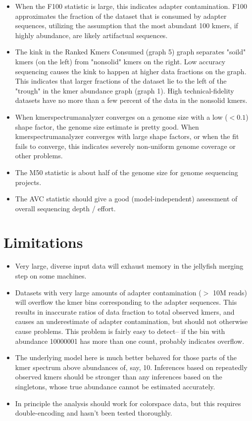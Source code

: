 \documentclass[11pt,fullpage]{article}
\begin{document}
\begin{itemize}
\item When the F100 statistic is large, this indicates adapter contamination.
F100 approximates the fraction of the dataset that is consumed by adapter sequences,
utilizing the assumption that the most abundant 100 kmers, if highly abundance,
are likely artifactual sequences.
\item The kink in the Ranked Kmers Consumed (graph 5) graph separates "soild" kmers
(on the left) from "nonsolid" kmers on the right.
Low accuracy sequencing causes the kink to happen at higher data fractions on the graph.
This indicates that larger fractions of the dataset lie to the left of the "trough" in
the kmer abundance graph (graph 1).
High technical-fidelity datasets have no more than a few percent of the data in the
nonsolid kmers.
\item When kmerspectrumanalyzer converges on a genome size with a low ($< 0.1$) shape
factor, the genome size estimate is pretty good.  When kmerspectrumanalyzer converges
with large shape factors, or when the fit fails to converge, this indicates severely
non-uniform genome coverage or other problems.
\item The M50 statistic is about half of the genome size for genome sequencing projects.
\item The AVC statistic should give a good (model-independent) assessment of overall sequencing
depth / effort.
\end{itemize}

\section{Limitations}
\begin{itemize}
\item Very large, diverse input data will exhaust memory in the jellyfish merging step on some machines.
\item Datasets with very large amounts of adapter contamination ($>$ 10M reads) will overflow the kmer bins
corresponding to the adapter sequences.  This results in inaccurate ratios of
data fraction to total observed kmers, and causes an underestimate of adapter contamination,
but should not otherwise cause problems.  This problem is fairly easy to detect--
if the bin with abundance 10000001 has more than one count, probably indicates overflow.
\item  The underlying model here is much better behaved for those parts of the kmer spectrum
above abundances of, say, 10.  Inferences based on repeatedly observed kmers should
be stronger than any inferences based on the singletons, whose true abundance cannot be
estimated accurately.
\item
In principle the analysis should work for colorspace data, but this requires
double-encoding and hasn't been tested thoroughly.
\end{itemize}
\end{document}
